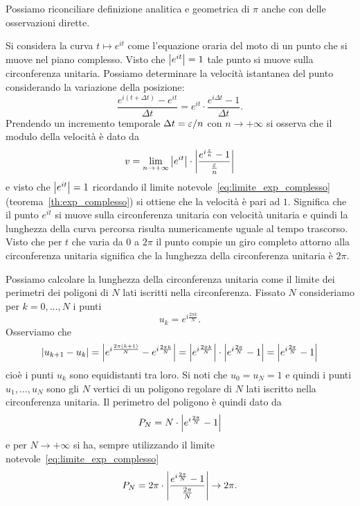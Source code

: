Possiamo riconciliare definizione analitica e geometrica di $\pi$ anche
con delle osservazioni dirette.

\begin{remark}
Si considera la curva $t\mapsto e^{it}$
come l'equazione oraria del moto di un punto
che si muove nel piano complesso. Visto che ${\left|e^{it}\right|}=1$
tale punto si muove sulla circonferenza unitaria.
Possiamo determinare la velocità istantanea del punto considerando
la variazione della posizione:
\[
  \frac{e^{i(t+\Delta t)}-e^{it}}{\Delta t}
  = e^{it}\cdot \frac{e^{i\Delta t}-1}{\Delta t}.
\]
Prendendo un incremento temporale $\Delta t = \varepsilon /n$ con $n\to +\infty$
si osserva che il modulo della velocità è dato da
\[
 v = \lim_{n\to +\infty} {\left|e^{it}\right|}\cdot {\left|\frac{e^{i\frac {\varepsilon}n}-1}{\frac {\varepsilon}n}\right|}
\]
e visto che ${\left|e^{it}\right|}=1$ ricordando il limite notevole~\eqref{eq:limite_exp_complesso}
(teorema~\ref{th:exp_complesso}) si ottiene che la velocità è pari ad $1$.
Significa che il punto $e^{it}$ si muove sulla circonferenza unitaria
con velocità unitaria e quindi la lunghezza della curva percorsa risulta
numericamente uguale al tempo trascorso.
Visto che per $t$ che varia da $0$ a $2\pi$
il punto compie un giro completo attorno alla circonferenza unitaria
significa che la lunghezza della circonferenza unitaria è $2\pi$.
\end{remark}

\begin{remark}
\label{rem:pi}
Possiamo
calcolare la lunghezza della circonferenza unitaria come il limite dei perimetri dei poligoni
di $N$ lati iscritti nella circonferenza.
Fissato $N$
consideriamo per $k=0, \dots, N$ i punti
\[
  u_k = e^{i\frac{2\pi k}{N}}.
\]
Osserviamo che
\[
  {\left|u_{k+1}-u_k\right|}
  = {\left|e^{i\frac{2\pi (k+1)} N}-e^{i\frac{2\pi k} N}\right|}
  = {\left|e^{i\frac{2\pi k}{N}}\right|} \cdot {\left|e^{i\frac{2\pi}{N}}-1\right|}
  = {\left|e^{i\frac{2\pi}{N}}-1\right|}
\]
cioè i punti $u_k$ sono equidistanti tra loro.
Si noti che $u_0=u_N=1$
e quindi i punti $u_1,\dots, u_N$ sono gli $N$ vertici
di un poligono regolare di $N$ lati iscritto nella
circonferenza unitaria. Il perimetro del poligono è quindi
dato da
\[
P_N = N \cdot {\left|e^{i\frac{2\pi}{N}}-1\right|}
\]
e per $N\to +\infty$ si ha,
sempre utilizzando il limite notevole~\eqref{eq:limite_exp_complesso}
\[
P_N = 2 \pi \cdot {\left|\frac{e^{i\frac{2\pi}{N}}-1}{\frac{2\pi}{N}}\right|}
  \to 2\pi.
\]
\end{remark}

